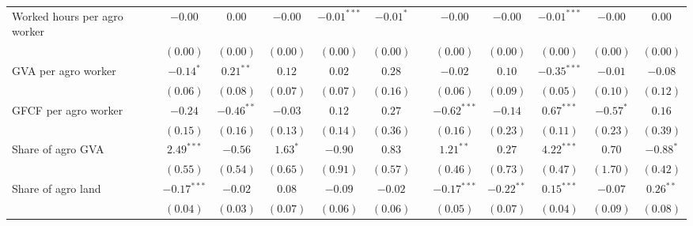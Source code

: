 \begin{table}
\begin{center}
\begin{tabular}{l c c c c c c c c c c c c}
Worked hours per agro worker      &               & $-0.00$       & $0.00$        & $-0.00$        & $-0.01^{***}$ & $-0.01^{*}$   &               & $-0.00$       & $-0.00$       & $-0.01^{***}$  & $-0.00$       & $0.00$        \\
                                  &               & $(0.00)$      & $(0.00)$      & $(0.00)$       & $(0.00)$      & $(0.00)$      &               & $(0.00)$      & $(0.00)$      & $(0.00)$       & $(0.00)$      & $(0.00)$      \\
GVA per agro worker               &               & $-0.14^{*}$   & $0.21^{**}$   & $0.12$         & $0.02$        & $0.28$        &               & $-0.02$       & $0.10$        & $-0.35^{***}$  & $-0.01$       & $-0.08$       \\
                                  &               & $(0.06)$      & $(0.08)$      & $(0.07)$       & $(0.07)$      & $(0.16)$      &               & $(0.06)$      & $(0.09)$      & $(0.05)$       & $(0.10)$      & $(0.12)$      \\
GFCF per agro worker              &               & $-0.24$       & $-0.46^{**}$  & $-0.03$        & $0.12$        & $0.27$        &               & $-0.62^{***}$ & $-0.14$       & $0.67^{***}$   & $-0.57^{*}$   & $0.16$        \\
                                  &               & $(0.15)$      & $(0.16)$      & $(0.13)$       & $(0.14)$      & $(0.36)$      &               & $(0.16)$      & $(0.23)$      & $(0.11)$       & $(0.23)$      & $(0.39)$      \\
Share of agro GVA                 &               & $2.49^{***}$  & $-0.56$       & $1.63^{*}$     & $-0.90$       & $0.83$        &               & $1.21^{**}$   & $0.27$        & $4.22^{***}$   & $0.70$        & $-0.88^{*}$   \\
                                  &               & $(0.55)$      & $(0.54)$      & $(0.65)$       & $(0.91)$      & $(0.57)$      &               & $(0.46)$      & $(0.73)$      & $(0.47)$       & $(1.70)$      & $(0.42)$      \\
Share of agro land                &               & $-0.17^{***}$ & $-0.02$       & $0.08$         & $-0.09$       & $-0.02$       &               & $-0.17^{***}$ & $-0.22^{**}$  & $0.15^{***}$   & $-0.07$       & $0.26^{**}$   \\
                                  &               & $(0.04)$      & $(0.03)$      & $(0.07)$       & $(0.06)$      & $(0.06)$      &               & $(0.05)$      & $(0.07)$      & $(0.04)$       & $(0.09)$      & $(0.08)$      \\

\end{tabular}
\end{center}
\end{table}
